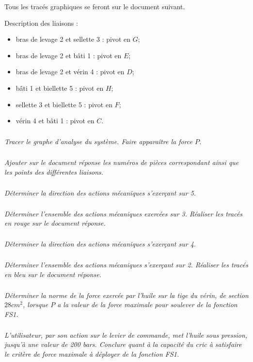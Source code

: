 \documentclass[10pt]{article}
\begin{document}
Tous les tracés graphiques se feront sur le document suivant.

Description des liaisons : 
\begin{itemize}
\item bras de levage 2 et sellette 3 : pivot en $G$;
\item bras de levage 2 et bâti 1 : pivot en $E$;
\item bras de levage 2 et vérin 4 : pivot en $D$;
\item bâti 1 et biellette 5 : pivot en $H$;
\item sellette 3 et biellette 5 : pivot en $F$;
\item vérin 4 et bâti 1 : pivot en $C$.
\end{itemize}

\subparagraph{}
\textit{Tracer le graphe d'analyse du système. Faire apparaître la force $P$.}

\subparagraph{}
\textit{Ajouter sur le document réponse les numéros de pièces correspondant ainsi que les points des différentes liaisons.}

\subparagraph{}
\textit{Déterminer la direction des actions mécaniques s'exerçant sur 5.}

\subparagraph{}
\textit{Déterminer l'ensemble des actions mécaniques exercées sur 3. Réaliser les tracés en rouge sur le document réponse.}

\subparagraph{}
\textit{Déterminer la direction des actions mécaniques s'exerçant sur 4.}

\subparagraph{}
\textit{Déterminer l'ensemble des actions mécaniques s'exerçant sur 2. Réaliser les tracés en bleu sur le document réponse. }

\subparagraph{}
\textit{Déterminer la norme de la force exercée par l'huile sur la tige du vérin, de section $28 cm^2$, lorsque $P$ a la valeur de la force maximale pour soulever de la fonction FS1.}

\subparagraph{}
\textit{L'utilisateur, par son action sur le levier de commande, met l'huile sous pression, jusqu'à une valeur de 200 bars. Conclure quant à la capacité du cric à satisfaire le critère de force maximale à déployer de la fonction FS1.}
\end{document}
